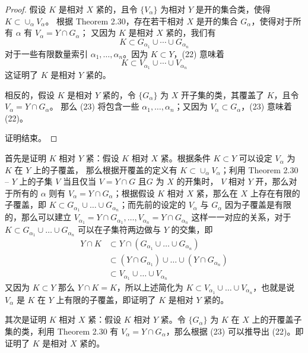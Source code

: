 \documentclass[../poma-notes.tex]{subfiles}
\begin{document}
\begin{proof}
  假设 $K$ 是相对 $X$ 紧的，且令 $\{V_{\alpha}\}$ 为相对 $Y$ 是开的集合类，使得 $K \subset \cup_{\alpha} V_{\alpha}$。
  根据 Theorem 2.30，存在若干相对 $X$ 是开的集合 $G_{\alpha}$，使得对于所有 $\alpha$ 有 $V_{\alpha} = Y \cap G_{\alpha}$；
  又因为 $K$ 是相对 $X$ 紧的，我们有
  \begin{equation}
    K \subset G_{\alpha_1} \cup \cdots \cup G_{\alpha_n}
  \end{equation}
  对于一些有限数量索引 $\alpha_1, \dots, \alpha_n$。因为 $K \subset Y$，(22) 意味着
  \begin{equation}
    K \subset V_{\alpha_1} \cup \cdots \cup V_{\alpha_n}
  \end{equation}
  这证明了 $K$ 是相对 $Y$ 紧的。

  相反的，假设 $K$ 是相对 $Y$ 紧的，令 $\{G_{\alpha}\}$ 为 $X$ 开子集的类，其覆盖了 $K$，且令 $V_{\alpha}=Y\cap G_{\alpha}$。
  那么 (23) 将包含一些 $\alpha_1, \dots, \alpha_n$；又因为 $V_{\alpha} \subset G_{\alpha}$，(23) 意味着 (22)。

  证明结束。
\end{proof}

\begin{anote}
  首先是证明 $K$ 相对 $Y$ 紧：假设 $K$ 相对 $X$ 紧。根据条件 $K \subset Y$ 可以设定 ${V_{\alpha}}$ 为 $K$ 在 $Y$ 上的子覆盖，
  那么根据开覆盖的定义有 $K \subset \cup_{\alpha}V_{\alpha}$；利用 Theorem 2.30 -- $Y$ 上的子集 $V$ 当且仅当 $V = Y \cap G$
  且$G$ 为 $X$ 的开集时， $V$ 相对 $Y$ 开，那么对于所有的 $\alpha$ 则有 $V_{\alpha} = Y \cap G_{\alpha}$；根据假设 $K$ 相对
  $X$ 紧，那么在 $X$ 上存在有限的子覆盖，即 $K \subset G_{\alpha_1} \cup \dots \cup G_{\alpha_n}$；而先前的设定的 $V_{\alpha}$
  与 $G_{\alpha}$ 因为子覆盖是有限的，那么可以建立 $V_{\alpha_1}=Y\cap G_{\alpha_1},\dots,V_{\alpha_n}=Y\cap G_{\alpha_n}$
  这样一一对应的关系，对于 $K \subset G_{\alpha_1} \cup \dots \cup G_{\alpha_n}$ 可以在子集符两边做与 $Y$ 的交集，即
  \begin{align*}
    \mathcal{} Y \cap K & \subset Y \cap \left(G_{\alpha_1} \cup \dots \cup G_{\alpha_n}\right)                     \\
                        & \subset \left(Y \cap G_{\alpha_1}\right) \cup \dots \cup \left(Y \cap G_{\alpha_n}\right) \\
                        & \subset V_{\alpha_1} \cup \dots \cup V_{\alpha_n}
  \end{align*}
  又因为 $K \subset Y$ 那么 $Y \cap K = K$，所以上述简化为 $K \subset V_{\alpha_1} \cup \dots \cup V_{\alpha_n}$，也就是说
  $V_{\alpha}$ 是 $K$ 在 $Y$ 上有限的子覆盖，即证明了 $K$ 是相对 $Y$ 紧的。

  其次是证明 $K$ 相对 $X$ 紧：假设 $K$ 相对 $Y$ 紧。令 $\{G_{\alpha}\}$ 为 $K$ 在 $X$ 上的开覆盖子集的类，利用 Theorem 2.30
  有 $V_{\alpha} = Y \cap G_{\alpha}$，那么根据 (23) 可以推导出 (22)。即证明了 $K$ 是相对 $X$ 紧的。
\end{anote}
\end{document}
